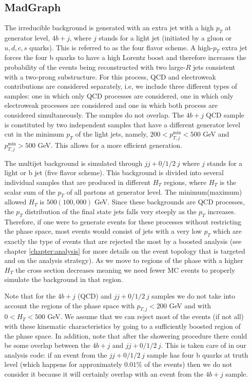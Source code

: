 \subsection{MadGraph}

The irreducible background is generated with an extra jet with a high $p_T$ at generator level, $4b+j$, where $j$ stands for a light jet (initiated by a gluon or $u,d,c,s$ quarks). This is referred to as the four flavor scheme. A high-$p_T$ extra jet forces the four b quarks to have a high Lorentz boost and therefore increases the probability of the events being reconstructed with two large-$R$ jets consistent with a two-prong substructure. For this process, QCD and electroweak contributions are considered separately, i.e, we include three different types of samples: one in which only QCD processes are considered, one in which only electroweak processes are considered and one in which both process are considered simultaneously. The samples do not overlap. The $4b+j$ QCD sample is constituted by two independent samples that have a different generator level cut in the minimum $p_T$ of the light jets, namely, $200<p_{T,j}^{\min}<500$ GeV and $p_{T,j}^{\min}>500$ GeV. This allows for a more efficient generation. 

The multijet background is simulated through $jj+0/1/2 ~j$ where $j$ stands for a light or b jet (five flavor scheme).
This background is divided into several individual samples that are produced in different $H_T$ regions, where $H_T$ is the scalar sum of the $p_T$ of all partons at generator level. The minimum(maximum) allowed $H_T$ is $500(100,000)$ GeV. Since these backgrounds are QCD processes, the $p_T$ distribution of the final state jets falls very steeply as the $p_T$ increases. Therefore, if one were to generate events for these processes without restricting the phase space, most events would consist of jets with a very low $p_T$ which are exactly the type of events that are rejected the most by a boosted analysis (see chapter \ref{chapter:analysis} for more details on the event topology that is targeted and on the analysis strategy). As we move to regions of the phase with a higher $H_T$ the cross section decreases meaning we need fewer MC events to properly simulate the background in that region.

Note that for the $4b+j$ (QCD) and $jj+0/1/2 ~j$ samples we do not take into account the regions of the phase space with $p_{T,j}<200$ GeV and with $0<H_T<500$ GeV. We assume that we can reject most of the events (if not all) with these kinematic characteristics by going to a sufficiently boosted region of the phase space. In addition, note that after the showering procedure there could be some overlap between the $4b+j$ and $jj+0/1/2~ j$. This is taken care of in our analysis code: if an event from the $jj+0/1/2 ~j$ sample has four b quarks at truth level (which happens for approximately $0.01\%$ of the events) then we do not consider it because it will certainly overlap with an event from the $4b+j$ sample.

